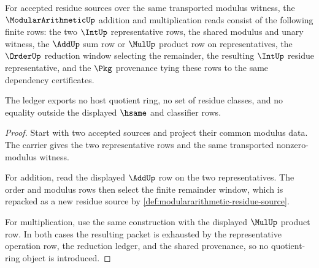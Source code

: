 \begin{theorem}
\label{thm:modulararithmetic-add-mul-ledger}
For accepted residue sources over the same transported modulus witness, the $\ModularArithmeticUp$ addition and multiplication reads consist of the following finite rows: the two $\IntUp$ representative rows, the shared modulus and unary witness, the $\AddUp$ sum row or $\MulUp$ product row on representatives, the $\OrderUp$ reduction window selecting the remainder, the resulting $\IntUp$ residue representative, and the $\Pkg$ provenance tying these rows to the same dependency certificates.

The ledger exports no host quotient ring, no set of residue classes, and no equality outside the displayed $\hsame$ and classifier rows.
\end{theorem}
\begin{proof}
Start with two accepted sources and project their common modulus data. The carrier gives the two representative rows and the same transported nonzero-modulus witness.

For addition, read the displayed $\AddUp$ row on the two representatives. The order and modulus rows then select the finite remainder window, which is repacked as a new residue source by \autoref{def:modulararithmetic-residue-source}.

For multiplication, use the same construction with the displayed $\MulUp$ product row. In both cases the resulting packet is exhausted by the representative operation row, the reduction ledger, and the shared provenance, so no quotient-ring object is introduced.
\end{proof}

